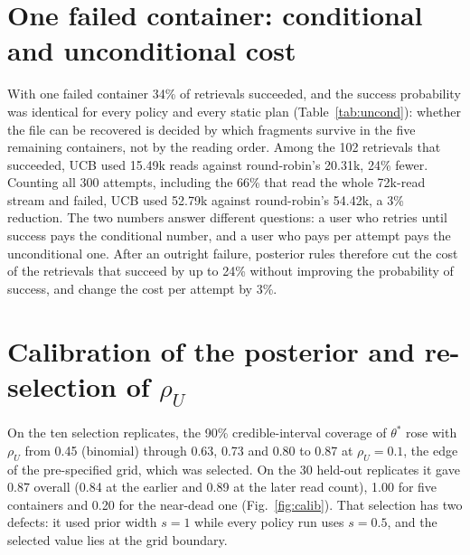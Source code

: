\documentclass[acmsmall,screen]{acmart}
\begin{document}
\section{One failed container: conditional and unconditional cost}\label{supp:uncond}

With one failed container 34\% of retrievals succeeded, and the success probability was identical for
every policy and every static plan (Table~\ref{tab:uncond}): whether the file can be recovered is decided
by which fragments survive in the five remaining containers, not by the reading order.  Among the 102
retrievals that succeeded, UCB used 15.49k reads against round-robin's 20.31k, 24\% fewer.  Counting all
300 attempts, including the 66\% that read the whole 72k-read stream and failed, UCB used 52.79k against
round-robin's 54.42k, a 3\% reduction.  The two numbers answer different questions: a user who retries
until success pays the conditional number, and a user who pays per attempt pays the unconditional one.
After an outright failure, posterior rules therefore cut the cost of the retrievals that succeed by up to
24\% without improving the probability of success, and change the cost per attempt by 3\%.

\section{Calibration of the posterior and re-selection of $\rho_U$}\label{supp:calib}

On the ten selection replicates, the 90\% credible-interval coverage of $\theta^\ast$ rose with $\rho_U$
from 0.45 (binomial) through 0.63, 0.73 and 0.80 to 0.87 at $\rho_U{=}0.1$, the edge of the pre-specified
grid, which was selected.  On the 30 held-out replicates it gave 0.87 overall (0.84 at the earlier and
0.89 at the later read count), 1.00 for five containers and 0.20 for the near-dead one
(Fig.~\ref{fig:calib}).  That selection has two defects: it used prior width $s{=}1$ while every policy
run uses $s{=}0.5$, and the selected value lies at the grid boundary.
\end{document}
